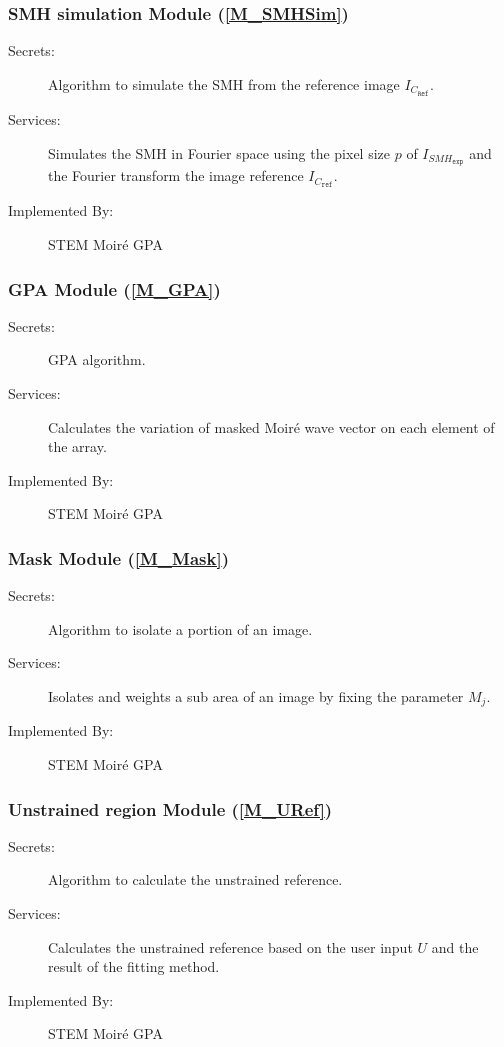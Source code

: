 \documentclass[12pt, titlepage]{article}
\newcommand{\progname}{STEM Moir{\'e} GPA}
\begin{document}
\subsubsection{SMH simulation Module (\texorpdfstring{\cref{M_SMHSim}}))}
\label{MG_SMHSim}
\begin{description}
\item[Secrets:] Algorithm to simulate the SMH from the reference image 
$I_{C_{\texttt{Ref}}}$.
\item[Services:] Simulates the SMH in Fourier space using the pixel size $p$ of 
$I_{\mathit{SMH}_{\texttt{exp}}}$ and the Fourier transform the image reference 
$I_{C_{\texttt{ref}}}$.
\item[Implemented By:] \progname{}
\end{description}

\subsubsection{GPA Module (\texorpdfstring{\cref{M_GPA}}))}
\label{MG_GPA}
\begin{description}
\item[Secrets:] GPA algorithm.
\item[Services:] Calculates the variation of masked Moir{\'e} wave vector on 
each element of the array.
\item[Implemented By:] \progname{}
\end{description}

\subsubsection{Mask Module (\texorpdfstring{\cref{M_Mask}}))}
\label{MG_Mask}
\begin{description}
\item[Secrets:] Algorithm to isolate a portion of an image.
\item[Services:] Isolates and weights a sub area of an image by fixing the 
parameter $M_j$.
\item[Implemented By:] \progname{}
\end{description}

\subsubsection{Unstrained region Module (\texorpdfstring{\cref{M_URef}}))}
\label{MG_URef}
\begin{description}
\item[Secrets:] Algorithm to calculate the unstrained reference.
\item[Services:] Calculates the unstrained reference based on the user input $U$ 
and the result of the fitting method.
\item[Implemented By:] \progname{}
\end{description}
\end{document}
